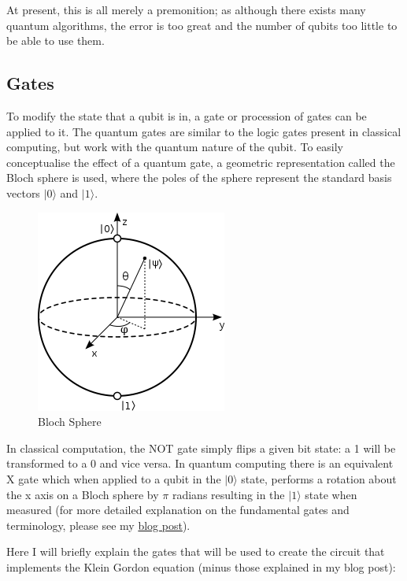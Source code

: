\documentclass{article}
\begin{document}
At present, this is all merely a premonition; as although there exists many quantum algorithms, the error is too great and the number of qubits too little to be able to use them.

\subsection{Gates}
To modify the state that a qubit is in, a gate or procession of gates can be applied to it. The quantum gates are similar to the logic gates present in classical computing, but work with the quantum nature of the qubit. To easily conceptualise the effect of a quantum gate, a geometric representation called the Bloch sphere is used, where the poles of the sphere represent the standard basis vectors $|0\rangle$ and $|1\rangle$.

\begin{figure}[!htb]
\includegraphics[scale=0.55]{../images/bloch_sphere}
  \centering
  \caption{Bloch Sphere \cite{blochsphere}}
\end{figure}

In classical computation, the NOT gate simply flips a given bit state: a 1 will be transformed to a 0 and vice versa. In quantum computing there is an equivalent X gate which when applied to a qubit in the $|0\rangle$ state, performs a rotation about the x axis on a Bloch sphere by $\pi$ radians resulting in the $|1\rangle$ state when measured (for more detailed explanation on the fundamental gates and terminology, please see my \href{https://desireevl.github.io/archive/2019/04/03/quantum-intro.html}{blog post}).

Here I will briefly explain the gates that will be used to create the circuit that implements the Klein Gordon equation (minus those explained in my blog post):
\newline
\end{document}
